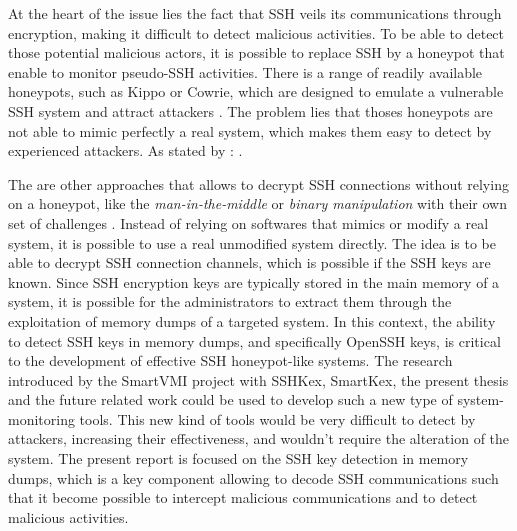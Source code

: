 At the heart of the issue lies the fact that SSH veils its communications through encryption, making it difficult to detect malicious activities. To be able to detect those potential malicious actors, it is possible to replace SSH by a honeypot that enable to monitor pseudo-SSH activities. There is a range of readily available honeypots, such as Kippo or Cowrie, which are designed to emulate a vulnerable SSH system and attract attackers \cite{ClassificationMalware21}. The problem lies that thoses honeypots are not able to mimic perfectly a real system, which makes them easy to detect by experienced attackers. As stated by :  \cite{SSHHoneypotEffectiveness23}. 

The are other approaches that allows to decrypt SSH connections without relying on a honeypot, like the \textit{man-in-the-middle} or \textit{binary manipulation} with their own set of challenges \cite{SSHkex22}. Instead of relying on softwares that mimics or modify a real system, it is possible to use a real unmodified system directly. The idea is to be able to decrypt SSH connection channels, which is possible if the SSH keys are known. Since SSH encryption keys are typically stored in the main memory of a system, it is possible for the administrators to extract them through the exploitation of memory dumps of a targeted system. In this context, the ability to detect SSH keys in memory dumps, and specifically OpenSSH keys, is critical to the development of effective SSH honeypot-like systems. The research introduced by the SmartVMI project with SSHKex, SmartKex, the present thesis and the future related work could be used to develop such a new type of system-monitoring tools. This new kind of tools would be very difficult to detect by attackers, increasing their effectiveness, and wouldn't require the alteration of the system. The present report is focused on the SSH key detection in memory dumps, which is a key component allowing to decode SSH communications such that it become possible to intercept malicious communications and to detect malicious activities.

